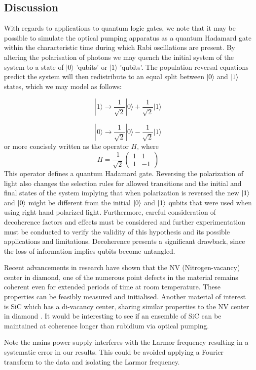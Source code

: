 \documentclass{article}
\DeclarePairedDelimiter\ket{\lvert}{\rangle}
\begin{document}
\begin{multicols*}{2}
\section{Discussion}
With regards to applications to quantum logic gates, we note that it may be possible to simulate the optical pumping apparatus as a quantum Hadamard gate within the characteristic time during which Rabi oscillations are present. By altering the polarisation of photons we may quench the initial system of the system to a state of $|0\rangle$ 'qubits' or $|1\rangle$ 'qubits'. The population reversal equations predict the system will then redistribute to an equal split between  $|0\rangle$ and $|1\rangle$ states, which we may model as follows:

\begin{equation}\label{mixed_plus}
  |1\rangle \longrightarrow \frac{1}{\sqrt{2}}|0\rangle + \frac{1}{\sqrt{2}}|1\rangle  
\end{equation}

\begin{equation}\label{mixed_minus}
    |0\rangle \longrightarrow \frac{1}{\sqrt{2}}|0\rangle - \frac{1}{\sqrt{2}}|1\rangle
\end{equation}
or more concisely written as the operator $H$, where
\begin{equation}\label{h_operator}
    H = \frac{1}{\sqrt{2}}\begin{pmatrix}
1 & 1\\ 
1 & -1
\end{pmatrix}
\end{equation}
This operator defines a quantum Hadamard gate. Reversing the polarization of light also changes the selection rules for allowed transitions and the initial and final states of the system implying that when polarization is reversed the new $\ket{1}$ and $\ket{0}$ might be different from the initial $\ket{0}$ and $\ket{1}$ qubits that were used when using right hand polarized light. Furthermore, careful consideration of decoherence factors and effects must be considered and further experimentation must be conducted to verify the validity of this hypothesis and its possible applications and limitations. Decoherence presents a significant drawback, since the loss of information implies qubits become untangled. 

Recent advancements in research have shown that the NV (Nitrogen-vacancy) center in diamond, one of the numerous point defects in the material remains coherent even for extended periods of time at room temperature. These properties can be feasibly measured and initialised. Another material of interest is SiC which has a di-vacancy center, sharing similar properties to the NV center in diamond \cite{eckstein}. It would be interesting to see if an ensemble of SiC can be maintained at coherence longer than rubidium via optical pumping.

Note the mains power supply interferes with the Larmor frequency resulting in a systematic error in our results. This could be avoided applying a Fourier transform to the data and isolating the Larmor frequency.
    
\printbibliography

\end{multicols*}
\end{document}
